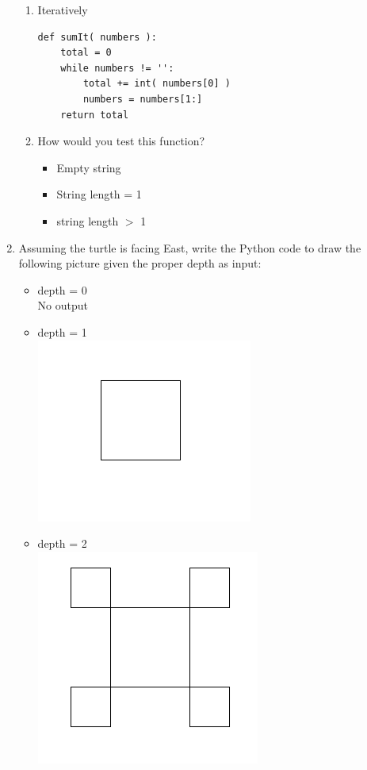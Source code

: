 \documentclass[11pt]{article}
\newenvironment{answer}{\large\lstset{basicstyle=\large}\color{white}}{}
\newenvironment{answer}{\large\lstset{basicstyle=\large}\color{red}}{}
\begin{document}
\begin{enumerate}
\begin{enumerate}
            \item Iteratively
\begin{answer}
\begin{lstlisting}
def sumIt( numbers ):
    total = 0
    while numbers != '':
        total += int( numbers[0] )
        numbers = numbers[1:]
    return total
\end{lstlisting}
\end{answer}
            \item How would you test this function?
                \begin{answer}
                \begin{itemize}
                    \item Empty string 
                    \item String length = 1
                    \item string length $>$ 1
                \end{itemize}
                \end{answer}
\pagebreak
\end{enumerate}
\item Assuming the turtle is facing East, write the Python code to draw the following picture given the proper depth as input:
    \begin{itemize}
            \item depth = 0
           \\No output 
            \item depth = 1\\
            \includegraphics[scale=0.4]{1.png}
            \item depth = 2 \\
            \includegraphics[scale=0.4]{2.png}

\end{itemize}
\end{enumerate}
\end{document}
